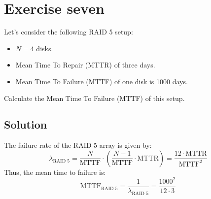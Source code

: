 \section{Exercise seven}

Let's consider the following RAID 5 setup:
\begin{itemize}
    \item $N=4$ disks.
    \item Mean Time To Repair (MTTR) of three days.
    \item Mean Time To Failure (MTTF) of one disk is 1000 days.
\end{itemize}
Calculate the Mean Time To Failure (MTTF) of this setup.

\subsection*{Solution}
The failure rate of the RAID 5 array is given by:
\[\lambda_{\text{RAID 5}}=\dfrac{N}{\text{MTTF}}\cdot\left(\dfrac{N-1}{\text{MTTF}}\cdot\text{MTTR}\right)=\dfrac{12\cdot\text{MTTR}}{\text{MTTF}^2}\]
Thus, the mean time to failure is:
\[\text{MTTF}_{\text{RAID 5}}=\dfrac{1}{\lambda_{\text{RAID 5}}}=\dfrac{1000^2}{12\cdot 3}\]